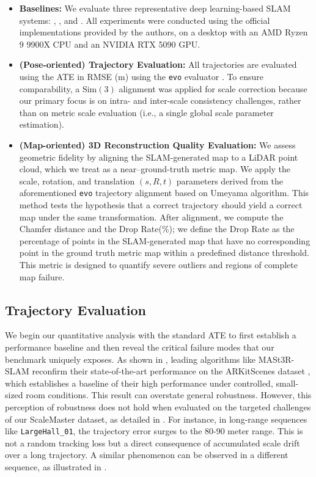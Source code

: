 % 
\begin{itemize}
  \item \textbf{Baselines:} 
  We evaluate three representative deep learning-based SLAM systems:  \cite{teed2021droid},  \cite{murai2025mast3r}, and  \cite{maggio2025vggt}. All experiments were conducted using the official implementations provided by the authors, on a desktop with an AMD Ryzen 9 9900X CPU and an NVIDIA RTX 5090 GPU.
  
  \item \textbf{(Pose-oriented) Trajectory Evaluation:} 
  All trajectories are evaluated using the \ac{ATE} in \ac{RMSE} (m) using the \texttt{evo} evaluator \cite{grupp2017evo}. To ensure comparability, a $\text{Sim}(3)$ alignment \cite{umeyama2002least} was applied for scale correction because our primary focus is on intra- and inter-scale consistency challenges, rather than on metric scale evaluation (i.e., a single global scale parameter estimation).
  
  \item \textbf{(Map-oriented) 3D Reconstruction Quality Evaluation:} 
  We assess geometric fidelity by aligning the SLAM-generated map to a LiDAR point cloud, which we treat as a near–ground-truth metric map. We apply the scale, rotation, and translation $(s,R,t)$ parameters derived from the aforementioned \texttt{evo} trajectory alignment based on Umeyama algorithm. This method tests the hypothesis that a correct trajectory should yield a correct map under the same transformation. After alignment, we compute the Chamfer distance and the Drop Rate(\%); we define the Drop Rate as the percentage of points in the SLAM-generated map that have no corresponding point in the ground truth metric map within a predefined distance threshold. This metric is designed to quantify severe outliers and regions of complete map failure.
\end{itemize}

% 
\subsection{Trajectory Evaluation}
\label{sec:exp-quant}

We begin our quantitative analysis with the standard \ac{ATE} to first establish a performance baseline and then reveal the critical failure modes that our benchmark uniquely exposes. As shown in  , leading algorithms like MASt3R-SLAM reconfirm their state-of-the-art performance on the ARKitScenes dataset \cite{dehghan2021arkitscenes}, which establishes a baseline of their high performance under controlled, small-sized room conditions. This result can overstate general robustness.
However, this perception of robustness does not hold when evaluated on the targeted challenges of our ScaleMaster dataset, as detailed in . For instance, in long-range sequences like \texttt{LargeHall\_01}, the trajectory error surges to the 80-90 meter range. This is not a random tracking loss but a direct consequence of accumulated scale drift over a long trajectory. A similar phenomenon can be observed in a different sequence, as illustrated in .

